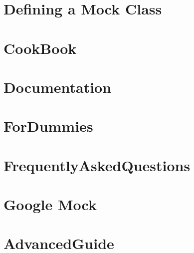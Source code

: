 \documentclass[twoside]{book}
\newcommand{\+}{\discretionary{\mbox{\scriptsize$\hookleftarrow$}}{}{}}
\begin{document}
\chapter{Defining a Mock Class}
\label{md_vendor_googletest_googlemock_docs_v1_7__cheat_sheet}

\chapter{Cook\+Book}
\label{md_vendor_googletest_googlemock_docs_v1_7__cook_book}

\chapter{Documentation}
\label{md_vendor_googletest_googlemock_docs_v1_7__documentation}

\chapter{For\+Dummies}
\label{md_vendor_googletest_googlemock_docs_v1_7__for_dummies}

\chapter{Frequently\+Asked\+Questions}
\label{md_vendor_googletest_googlemock_docs_v1_7__frequently_asked_questions}

\chapter{Google Mock}
\label{md_vendor_googletest_googlemock__r_e_a_d_m_e}

\chapter{Advanced\+Guide}
\label{md_vendor_googletest_googletest_docs__advanced_guide}

\end{document}
